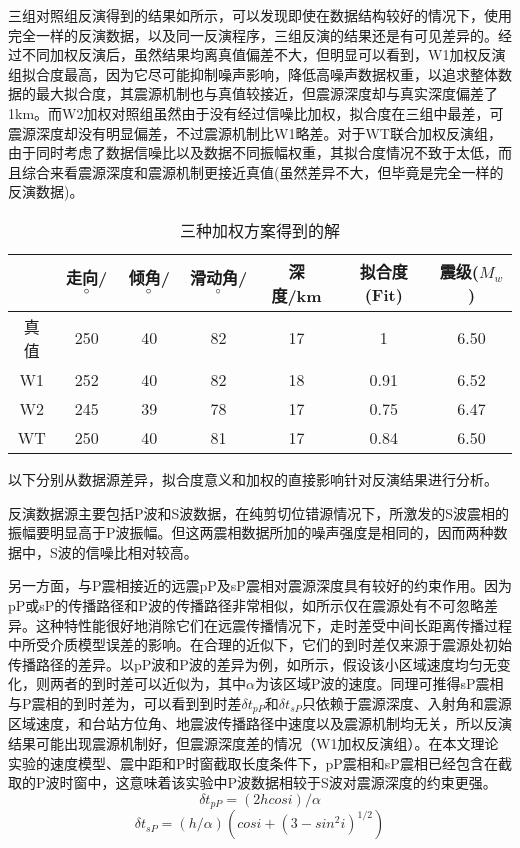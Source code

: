 三组对照组反演得到的结果如所示，可以发现即使在数据结构较好的情况下，使用完全一样的反演数据，以及同一反演程序，三组反演的结果还是有可见差异的。经过不同加权反演后，虽然结果均离真值偏差不大，但明显可以看到，W1加权反演组拟合度最高，因为它尽可能抑制噪声影响，降低高噪声数据权重，以追求整体数据的最大拟合度，其震源机制也与真值较接近，但震源深度却与真实深度偏差了1km。而W2加权对照组虽然由于没有经过信噪比加权，拟合度在三组中最差，可震源深度却没有明显偏差，不过震源机制比W1略差。对于WT联合加权反演组，由于同时考虑了数据信噪比以及数据不同振幅权重，其拟合度情况不致于太低，而且综合来看震源深度和震源机制更接近真值(虽然差异不大，但毕竟是完全一样的反演数据)。
\begin{table}[ht]
\centering
\caption{三种加权方案得到的解}
\label{tab3_01}
    \begin{tabular}{c c c c c c c}
    \hline
     & 走向/$^\circ$ & 倾角/$^\circ$ & 滑动角/$^\circ$ & 深度/km & 拟合度(Fit) & 震级($M_w$)\\
    \hline
    真值	& 250 & 40 & 82 & 17 & 1	& 6.50\\
    W1		& 252 & 40 & 82 & 18 & 0.91 & 6.52\\
    W2		& 245 & 39 & 78 & 17 & 0.75 & 6.47\\
    WT		& 250 & 40 & 81 & 17 & 0.84 & 6.50\\
    \hline
    \end{tabular}
\end{table}

以下分别从数据源差异，拟合度意义和加权的直接影响针对反演结果进行分析。

反演数据源主要包括P波和S波数据，在纯剪切位错源情况下，所激发的S波震相的振幅要明显高于P波振幅。但这两震相数据所加的噪声强度是相同的，因而两种数据中，S波的信噪比相对较高。

另一方面，与P震相接近的远震pP及sP震相对震源深度具有较好的约束作用。因为pP或sP的传播路径和P波的传播路径非常相似，如所示仅在震源处有不可忽略差异。这种特性能很好地消除它们在远震传播情况下，走时差受中间长距离传播过程中所受介质模型误差的影响。在合理的近似下，它们的到时差仅来源于震源处初始传播路径的差异\citep{Stein2003}。以pP波和P波的差异为例，如所示，假设该小区域速度均匀无变化，则两者的到时差可以近似为，其中$\alpha$为该区域P波的速度。同理可推得sP震相与P震相的到时差为，可以看到到时差${\delta}t_{pP}$和${\delta}t_{sP}$只依赖于震源深度、入射角和震源区域速度，和台站方位角、地震波传播路径中速度以及震源机制均无关，所以反演结果可能出现震源机制好，但震源深度差的情况（W1加权反演组）。在本文理论实验的速度模型、震中距和P时窗截取长度条件下，pP震相和sP震相已经包含在截取的P波时窗中，这意味着该实验中P波数据相较于S波对震源深度的约束更强。 
\begin{equation}
\label{eq3_01}
{\delta}t_{pP}=(2hcosi)/\alpha
\end{equation}
\begin{equation}
\label{eq3_02}
{\delta}t_{sP}=(h/\alpha)(cosi+(3-sin^2i)^{1/2})
\end{equation}

